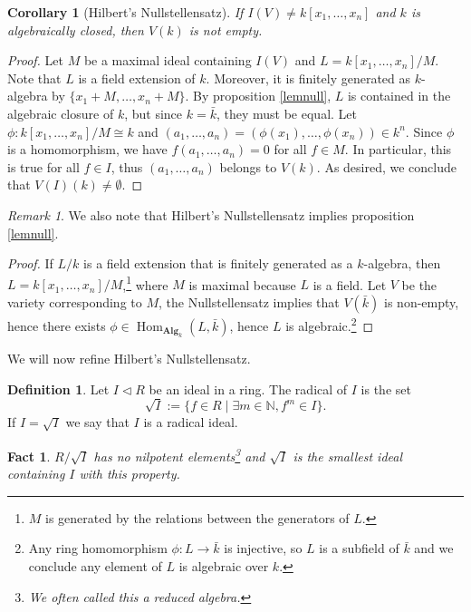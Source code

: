 \documentclass{tufte-handout} %
\newtheorem{cor}[thm]{Corollary}
\newtheorem{fact}[thm]{Fact}
\theoremstyle{definition}
\newtheorem{defn}[thm]{Definition}
\theoremstyle{remark}
\newtheorem{rem}[thm]{Remark}
\newcommand{\N}{\mathbb{N}}
\DeclareMathOperator{\Hom}{Hom}
\begin{document}
\begin{cor}[Hilbert's Nullstellensatz]
	If $I(V) \neq k[x_1, \dots, x_n]$ and $k$ is algebraically closed, then $V(k)$ is not empty.
\end{cor}
\begin{proof}
	Let $M$ be a maximal ideal containing $I(V)$ and $L = k[x_1, \dots, x_n]/M$. Note that $L$ is a field extension of $k$. Moreover, it is finitely generated as $k$-algebra by $\{x_1 + M, \dots, x_n + M\}$. By proposition \ref{lemnull}, $L$ is contained in the algebraic closure of $k$, but since $k = \bar{k}$, they must be equal. Let $\phi : k[x_1, \dots, x_n]/M \cong k$ and $(a_1, \dots, a_n) = (\phi(x_1),\dots, \phi(x_n)) \in k^n$. Since $\phi$ is a homomorphism, we have $f(a_1, \dots, a_n) = 0$ for all $f \in M$. In particular, this is true for all $f \in I$, thus $(a_1, \dots, a_n)$ belongs to $V(k)$. As desired, we conclude that $V(I)(k) \neq \emptyset$.
\end{proof}
\begin{rem}
	We also note that Hilbert's Nullstellensatz implies proposition \ref{lemnull}.
	\begin{proof}
		If $L/k$ is a field extension that is finitely generated as a $k$-algebra, then $L = k[x_1, \dots, x_n]/M$,\footnote{$M$ is generated by the relations between the generators of $L$.} where $M$ is maximal because $L$ is a field. Let $V$ be the variety corresponding to $M$, the Nullstellensatz implies that $V(\bar{k})$ is non-empty, hence there exists $\phi \in \Hom_{\textbf{Alg}_k}(L,\bar{k})$, hence $L$ is algebraic.\footnote{Any ring homomorphism $\phi:L \rightarrow \bar{k}$ is injective, so $L$ is a subfield of $\bar{k}$ and we conclude any element of $L$ is algebraic over $k$.}
	\end{proof}
\end{rem}

We will now refine Hilbert's Nullstellensatz.

\begin{defn}
	Let $I \lhd R$ be an ideal in a ring. The radical of $I$ is the set \[\sqrt{I}:= \{f \in R \mid \exists m \in \N, f^m \in I\}.\]
	If $I = \sqrt{I}$ we say that $I$ is a radical ideal.
\end{defn}
\begin{fact}
	$R/\sqrt{I}$ has no nilpotent elements\footnote{We often called this a reduced algebra.} and $\sqrt{I}$ is the smallest ideal containing $I$ with this property.
\end{fact}
\end{document}
